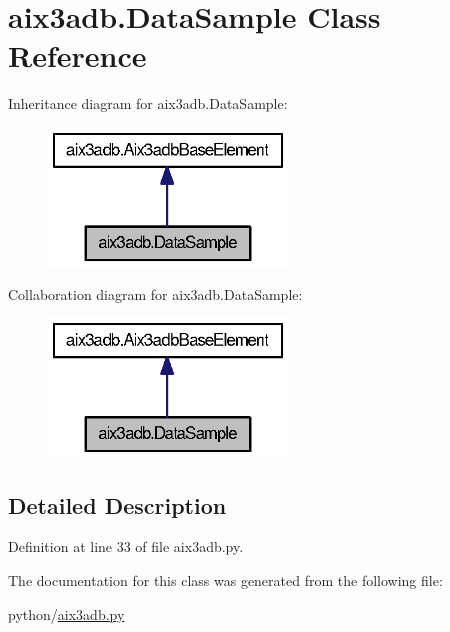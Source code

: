 \section{aix3adb.\-Data\-Sample Class Reference}
\label{classaix3adb_1_1DataSample}


Inheritance diagram for aix3adb.\-Data\-Sample\-:
\nopagebreak
\begin{figure}[H]
\begin{center}
\leavevmode
\includegraphics[width=180pt]{classaix3adb_1_1DataSample__inherit__graph}
\end{center}
\end{figure}


Collaboration diagram for aix3adb.\-Data\-Sample\-:
\nopagebreak
\begin{figure}[H]
\begin{center}
\leavevmode
\includegraphics[width=180pt]{classaix3adb_1_1DataSample__coll__graph}
\end{center}
\end{figure}


\subsection{Detailed Description}


Definition at line 33 of file aix3adb.\-py.



The documentation for this class was generated from the following file\-:\begin{DoxyCompactItemize}
\item 
python/\hyperlink{aix3adb_8py}{aix3adb.\-py}\end{DoxyCompactItemize}
